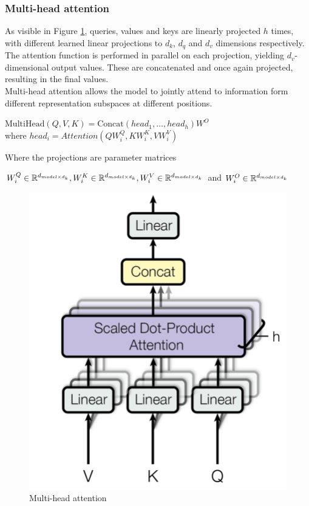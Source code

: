 \documentclass[\main/main.tex]{subfiles}
\begin{document}
\subsubsection{Multi-head attention}
As visible in Figure \ref{fig:multi-head_attention}, queries, values and keys are linearly projected $h$ times, with different learned linear projections to $d_k$, $d_q$ and $d_v$ dimensions respectively. The attention function is performed in parallel on each projection, yielding $d_v$-dimensional output values. These are concatenated and once again projected, resulting in the final values. \\
Multi-head attention allows the model to jointly attend to information form different representation subspaces at different positions. 
\begin{center}
    $\mathrm{MultiHead}(Q, V, K) =\mathrm{Concat}(head_1, \dots, head_h)W^O$\\
    where $head_i = Attention(QW^Q_i, KW^K_i, VW^V_i)$
\end{center}
Where the projections are parameter matrices 
\begin{center}
    $W^Q_i\in\mathbb{R}^{d_{model \times d_k}}, W^K_i\in\mathbb{R}^{d_{model \times d_k}}, W^V_i\in\mathbb{R}^{d_{model \times d_k}}$ and $ W^O_i\in\mathbb{R}^{d_{model \times d_k}}$
\end{center}

\begin{figure}[H]
    \centering
    \includegraphics[scale=0.25]{images/transformer/multi-headed_attention.jpeg}
    \caption{Multi-head attention}
    \label{fig:multi-head_attention}
\end{figure}
\end{document}
